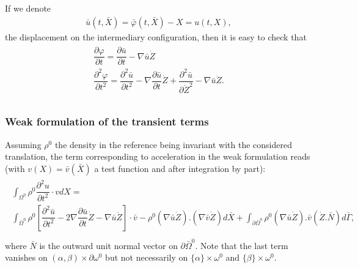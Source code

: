 \documentclass[a4paper,11pt,english]{sphinxmanual}
\begin{document}
If we denote
\begin{equation*}
\begin{split}\bar{u}(t,\bar{X}) = \bar{\varphi}(t, \bar{X}) - X = u(t, X),\end{split}
\end{equation*}
the displacement on the intermediary configuration, then it is easy to check that
\begin{align*}\!\begin{aligned}
\dfrac{\partial \varphi}{\partial t} = \dfrac{\partial \bar{u}}{\partial t} - \nabla \bar{u} \dot{Z}\\
\dfrac{\partial^2 \varphi}{\partial t^2} = \dfrac{\partial^2 \bar{u}}{\partial t^2} - \nabla\dfrac{\partial \bar{u}}{\partial t}\dot{Z} + \dfrac{\partial^2 \bar{u}}{\partial \dot{Z}^2} - \nabla\bar{u}\ddot{Z}.\\
\end{aligned}\end{align*}

\subsubsection{Weak formulation of the transient terms}
\label{\detokenize{userdoc/model_ALE_rotating:id4}}
Assuming \(\rho^0\) the density in the reference being invariant with the considered translation, the term corresponding to acceleration in the weak formulation reads (with \(v(X) = \bar{v}(\bar{X})\) a test function and after integration by part):
\begin{align*}\!\begin{aligned}
\int_{\Omega^0} \rho^0 \dfrac{\partial^2 u}{\partial t^2}\cdot vdX =\\
\int_{\bar{\Omega}^{0}} \rho^0 \left[\dfrac{\partial^2 \bar{u}}{\partial t^2} - 2\nabla\dfrac{\partial \bar{u}}{\partial t}\dot{Z} - \nabla\bar{u}\ddot{Z}\right]\cdot \bar{v}  - \rho^0 (\nabla\bar{u}\dot{Z}).(\nabla\bar{v}\dot{Z}) d\bar{X} + \int_{\partial \bar{\Omega}^0} \rho^0 (\nabla\bar{u}\dot{Z}).\bar{v}(\dot{Z}.\bar{N}) d\bar{\Gamma},\\
\end{aligned}\end{align*}
where \(\bar{N}\) is the outward unit normal vector on \(\partial \bar{\Omega}^0\). Note that the last term vanishes on \((\alpha, \beta) \times \partial \omega^0\) but not necessarily on \(\{\alpha\} \times \omega^0\) and \(\{\beta\} \times \omega^0\).
\end{document}
